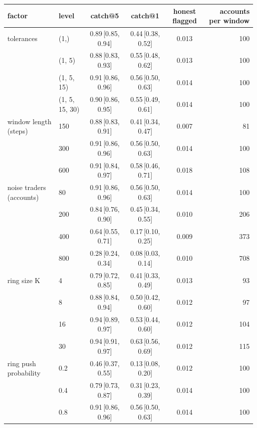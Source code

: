 \begin{tabular}{llcccr}
\toprule
factor & level & catch@5 & catch@1 & honest flagged & accounts per window \\
\midrule
tolerances & (1,) & 0.89\,{\scriptsize[0.85, 0.94]} & 0.44\,{\scriptsize[0.38, 0.52]} & 0.013 & 100 \\
 & (1, 5) & 0.88\,{\scriptsize[0.83, 0.93]} & 0.55\,{\scriptsize[0.48, 0.62]} & 0.013 & 100 \\
 & (1, 5, 15) & 0.91\,{\scriptsize[0.86, 0.96]} & 0.56\,{\scriptsize[0.50, 0.63]} & 0.014 & 100 \\
 & (1, 5, 15, 30) & 0.90\,{\scriptsize[0.86, 0.95]} & 0.55\,{\scriptsize[0.49, 0.61]} & 0.014 & 100 \\
window length (steps) & 150 & 0.88\,{\scriptsize[0.83, 0.91]} & 0.41\,{\scriptsize[0.34, 0.47]} & 0.007 & 81 \\
 & 300 & 0.91\,{\scriptsize[0.86, 0.96]} & 0.56\,{\scriptsize[0.50, 0.63]} & 0.014 & 100 \\
 & 600 & 0.91\,{\scriptsize[0.84, 0.97]} & 0.58\,{\scriptsize[0.46, 0.71]} & 0.018 & 108 \\
noise traders (accounts) & 80 & 0.91\,{\scriptsize[0.86, 0.96]} & 0.56\,{\scriptsize[0.50, 0.63]} & 0.014 & 100 \\
 & 200 & 0.84\,{\scriptsize[0.76, 0.90]} & 0.45\,{\scriptsize[0.34, 0.55]} & 0.010 & 206 \\
 & 400 & 0.64\,{\scriptsize[0.55, 0.71]} & 0.17\,{\scriptsize[0.10, 0.25]} & 0.009 & 373 \\
 & 800 & 0.28\,{\scriptsize[0.24, 0.34]} & 0.08\,{\scriptsize[0.03, 0.14]} & 0.010 & 708 \\
ring size K & 4 & 0.79\,{\scriptsize[0.72, 0.85]} & 0.41\,{\scriptsize[0.33, 0.49]} & 0.013 & 93 \\
 & 8 & 0.88\,{\scriptsize[0.84, 0.94]} & 0.50\,{\scriptsize[0.42, 0.60]} & 0.012 & 97 \\
 & 16 & 0.94\,{\scriptsize[0.89, 0.97]} & 0.53\,{\scriptsize[0.44, 0.60]} & 0.012 & 104 \\
 & 30 & 0.94\,{\scriptsize[0.91, 0.97]} & 0.63\,{\scriptsize[0.56, 0.69]} & 0.012 & 115 \\
ring push probability & 0.2 & 0.46\,{\scriptsize[0.37, 0.55]} & 0.13\,{\scriptsize[0.08, 0.20]} & 0.012 & 100 \\
 & 0.4 & 0.79\,{\scriptsize[0.73, 0.87]} & 0.31\,{\scriptsize[0.23, 0.39]} & 0.014 & 100 \\
 & 0.8 & 0.91\,{\scriptsize[0.86, 0.96]} & 0.56\,{\scriptsize[0.50, 0.63]} & 0.014 & 100 \\
\bottomrule
\end{tabular}
